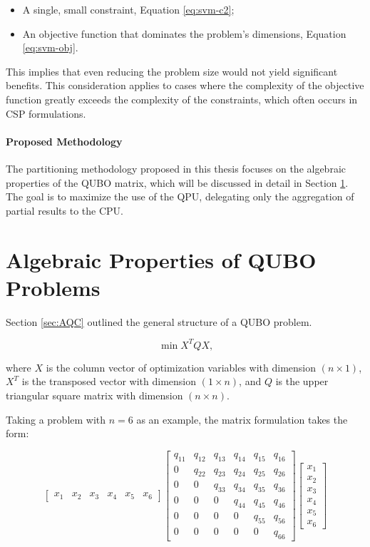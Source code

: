 \begin{itemize} 
	\item A single, small constraint, Equation \eqref{eq:svm-c2}; 
	\item An objective function that dominates the problem's dimensions, Equation \eqref{eq:svm-obj}. 
\end{itemize}

This implies that even reducing the problem size would not yield significant benefits. 
This consideration applies to cases where the complexity of the objective function greatly exceeds the complexity of the constraints, which often occurs in CSP formulations.

\paragraph{Proposed Methodology} The partitioning methodology proposed in this thesis focuses on the algebraic properties of the QUBO matrix, which will be discussed in detail in Section \ref{sec:prop}. 
The goal is to maximize the use of the QPU, delegating only the aggregation of partial results to the CPU.

\section{Algebraic Properties of QUBO Problems}\label{sec:prop}

Section \ref{sec:AQC} outlined the general structure of a QUBO problem. 

$$\min X^TQX\text{,}$$

where $X$ is the column vector of optimization variables with dimension $(n \times 1)$, $X^T$ is the transposed vector with dimension $(1 \times n)$, and $Q$ is the upper triangular square matrix with dimension $(n \times n)$.

Taking a problem with $n=6$ as an example, the matrix formulation takes the form:

\begin{equation}
    \begin{bmatrix}
        x_1 & x_2 & x_3 & x_4 & x_5 & x_6
    \end{bmatrix}
    \begin{bmatrix}
        q_{11} & q_{12} & q_{13} & q_{14} & q_{15} & q_{16} \\
        0 & q_{22} & q_{23} & q_{24} & q_{25} & q_{26} \\
        0 & 0 & q_{33} & q_{34} & q_{35} & q_{36} \\
        0 & 0 & 0 & q_{44} & q_{45} & q_{46} \\
        0 & 0 & 0 & 0 & q_{55} & q_{56} \\
        0 & 0 & 0 & 0 & 0 & q_{66}
    \end{bmatrix}
    \begin{bmatrix}
        x_1 \\
        x_2 \\
        x_3 \\
        x_4 \\
        x_5 \\
        x_6
    \end{bmatrix}
\end{equation}

